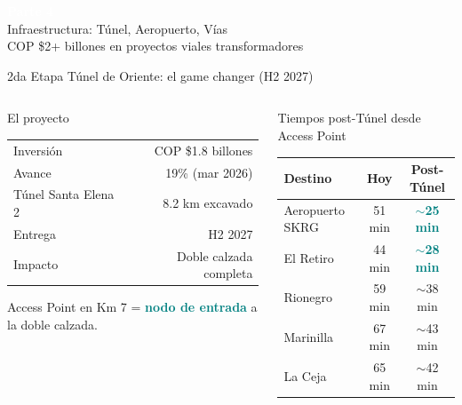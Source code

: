 \documentclass[aspectratio=169, 11pt]{beamer}
\newcommand{\highlight}[1]{\textcolor{teal}{\textbf{#1}}}
\begin{document}
{
\begin{frame}[plain]
\vfill
\begin{center}
{\Huge\bfseries\textcolor{white}{Parte 4}}\\[8pt]
{\Large\textcolor{white!85}{Infraestructura: Túnel, Aeropuerto, Vías}}\\[12pt]
{\normalsize\textcolor{white!60}{COP \$2+ billones en proyectos viales transformadores}}
\end{center}
\vfill
\end{frame}
}

{
\begin{frame}{2da Etapa Túnel de Oriente: el game changer (H2 2027)}
\begin{columns}[T]
\begin{block}{\small El proyecto}
\scriptsize
\begin{tabular}{@{}lr@{}}
Inversión & COP \$1.8 billones \\
Avance & 19\% (mar 2026) \\
Túnel Santa Elena 2 & 8.2 km excavado \\
Entrega & H2 2027 \\
Impacto & Doble calzada completa \\
\end{tabular}

\vspace{2pt}
Access Point en Km 7 = \highlight{nodo de entrada} a la doble calzada.
\end{block}

\vspace{2pt}
\begin{alertblock}{\small Tiempos post-Túnel desde Access Point}
\scriptsize
\begin{tabular}{@{}lcc@{}}
\toprule
\textbf{Destino} & \textbf{Hoy} & \textbf{Post-Túnel} \\
\midrule
\rowcolor{teal!10}
Aeropuerto SKRG & 51 min & \highlight{$\sim$25 min} \\
El Retiro & 44 min & \highlight{$\sim$28 min} \\
Rionegro & 59 min & $\sim$38 min \\
Marinilla & 67 min & $\sim$43 min \\
La Ceja & 65 min & $\sim$42 min \\
\bottomrule
\end{tabular}
\end{alertblock}


\end{columns}
\end{frame}}
\end{document}
